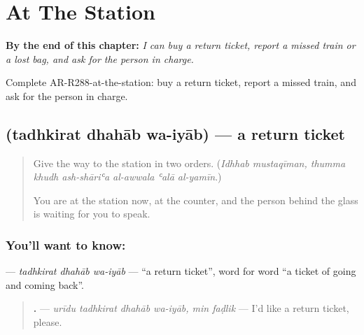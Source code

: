 
\chapter{At The Station}
\label{ch:ar-at-the-station}

\begin{chapteropening}
\textbf{By the end of this chapter:} \emph{I can buy a return ticket, report a missed train or a lost bag, and ask for the person in charge.}

Complete AR-R288-at-the-station: buy a return ticket, report a missed train, and ask for the person in charge.
\end{chapteropening}

\section[\texorpdfstring{\ar{تذكرة} \ar{ذهاب} \ar{وإياب} (tadhkirat dhahāb …)}{تذكرة ذهاب وإياب (tadhkirat dhahāb …)}]{   (tadhkirat dhahāb wa-iyāb) — a return ticket}

\label{lesson:AR-C288-dhahab-wa-iyab}



\begin{quote}
Give the way to the station in two orders. (\emph{Idhhab mustaqīman, thumma khudh ash-shāriʿa al-awwala ʿalā al-yamīn}.)

You are at the station now, at the counter, and the person behind the glass is waiting for you to speak.
\end{quote}

\subsection*{You'll want to know:   }
\textbf{  } — \emph{tadhkirat dhahāb wa-iyāb} — \textquotedblleft{}a return ticket\textquotedblright{}, word for word \textquotedblleft{}a ticket of going and coming back\textquotedblright{}.

\begin{quote}
\textbf{     .} — \emph{urīdu tadhkirat dhahāb wa-iyāb, min faḍlik} — I'd like a return ticket, please.
\end{quote}

